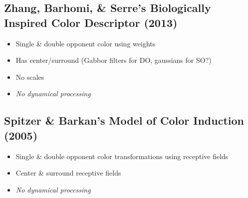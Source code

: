 \documentclass[journal,onecolumn]{IEEEtran}
\begin{document}
\subsection*{Zhang, Barhomi, \& Serre's Biologically Inspired Color Descriptor (2013)}
\begin{itemize}
    \item Single \& double opponent color using weights
    \item Has center/surround (Gabbor filters for DO, gaussians for SO?)
    \item No scales
    \item \textit{No dynamical processing}
\end{itemize}


\subsection*{Spitzer \& Barkan's Model of Color Induction (2005)}
\begin{itemize}
    \item Single \& double opponent color transformations using receptive fields
    \item Center \& surround receptive fields
    \item \textit{No dynamical processing}
\end{itemize}
\end{document}
